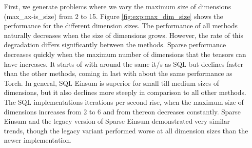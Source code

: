 \noindent
First, we generate problems where we vary the maximum size of dimensions (max\_ax-is\_size)
from 2 to 15. Figure \ref{fig:exp:max_dim_size} shows the performance for the different
dimension sizes. The performance of all methods naturally decreases when the size of dimensions
grows. However, the rate of this degradation differs significantly between the methods.
Sparse performance decreases quickly when the maximum number of dimensions that the tensors
can have increases. It starts of with around the same it/s as SQL but declines faster than
the other methods, coming in last with about the same performance as Torch. In general,
SQL Einsum is superior for small till medium sizes of dimensions, but it also declines more
steeply in comparison to all other methods. The SQL implementations iterations per second rise,
when the maximum size of dimensions increases from 2 to 6 and from thereon decreases constantly.
Sparse Einsum and the legacy version of Sparse Einsum demonstrated very similar trends,
though the legacy variant performed worse at all dimension sizes than the newer implementation.

